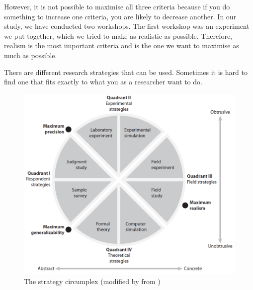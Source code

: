 However, it is not possible to maximise all three criteria because if you do something to increase one criteria, you are likely to decrease another. In our study, we have conducted two workshops. The first workshop was an experiment we put together, which we tried to make as realistic as possible. Therefore, realism is the most important criteria and is the one we want to maximise as much as possible.

There are different research strategies that can be used. Sometimes it is hard to find one that fits exactly to what you as a researcher want to do.
\begin{figure}
\begin{center}
\includegraphics[scale=0.5]{circumplex}
\caption[The strategy circumplex]{The strategy circumplex (modified by \cite{alsos} from \cite{McGrath})}
\label{fig:circumplex}
\end{center}
\end{figure} 
